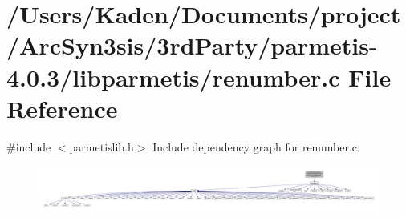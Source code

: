 \hypertarget{a00398}{}\section{/\+Users/\+Kaden/\+Documents/project/\+Arc\+Syn3sis/3rd\+Party/parmetis-\/4.0.3/libparmetis/renumber.c File Reference}
\label{a00398}
{\ttfamily \#include $<$parmetislib.\+h$>$}\newline
Include dependency graph for renumber.\+c\+:\nopagebreak
\begin{figure}[H]
\begin{center}
\leavevmode
\includegraphics[width=350pt]{a00399}
\end{center}
\end{figure}
